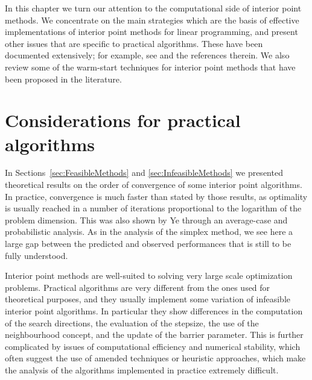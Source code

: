 
%
%
\label{ch:PracticalIpm}

In this chapter we turn our attention to the computational side of
interior point methods. We concentrate on the main strategies which are
the basis of effective implementations of interior point methods
for linear programming, and present other issues that are specific
to practical algorithms.
These have been documented extensively; for example, see
\cite{AndersenGondzioMeszarosXu,GondzioTerlaky,ipm:Wright97} 
and the references therein.
We also review some of the warm-start techniques for interior point methods
that have been proposed in the literature.


%
%
\section{Considerations for practical algorithms}

In Sections~\ref{sec:FeasibleMethods} and \ref{sec:InfeasibleMethods}
we presented theoretical
results on the order of convergence of some interior point algorithms.
In practice, convergence is much faster than stated by those results, as
optimality is usually reached in a number of iterations 
proportional to the logarithm of the problem dimension. 
This was also shown by Ye \cite[Chapter~6]{Ye97} through an
average-case and probabilistic analysis.
As in the analysis of the simplex method, we see here a large
gap between the predicted and observed performances that is still to
be fully understood.

Interior point methods are well-suited to solving very
large scale optimization problems.
Practical algorithms are very different from the ones used for
theoretical purposes, and they usually implement some variation
of infeasible interior point algorithms. In particular they show
differences in the computation of the search directions, 
the evaluation of the stepsize, 
the use of the neighbourhood concept, and the update of the
barrier parameter.
This is further complicated by issues of computational efficiency
and numerical stability, which often suggest the use of amended
techniques or heuristic approaches, which make
the analysis of the algorithms implemented in practice extremely difficult.

